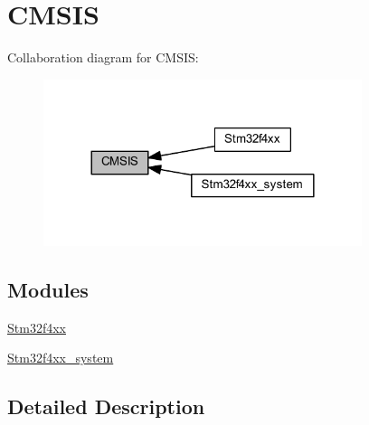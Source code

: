 \hypertarget{group___c_m_s_i_s}{}\section{C\+M\+S\+IS}
\label{group___c_m_s_i_s}
Collaboration diagram for C\+M\+S\+IS\+:
\nopagebreak
\begin{figure}[H]
\begin{center}
\leavevmode
\includegraphics[width=264pt]{group___c_m_s_i_s}
\end{center}
\end{figure}
\subsection*{Modules}
\begin{DoxyCompactItemize}
\item 
\hyperlink{group__stm32f4xx}{Stm32f4xx}
\item 
\hyperlink{group__stm32f4xx__system}{Stm32f4xx\+\_\+system}
\end{DoxyCompactItemize}


\subsection{Detailed Description}

